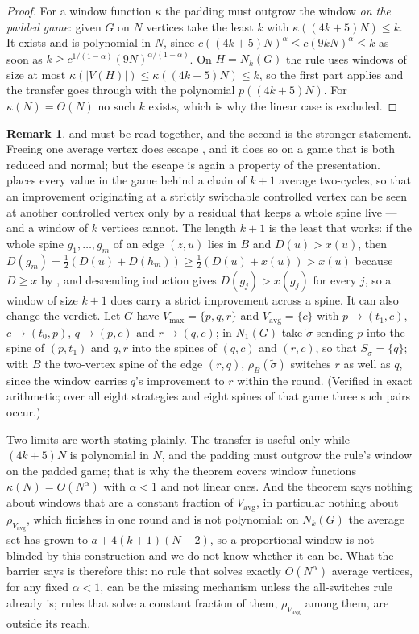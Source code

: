 \documentclass[11pt]{article}
\theoremstyle{plain}
\theoremstyle{definition}
\newtheorem{remark}[theorem]{Remark}
\newcommand{\Vmax}{V_{\max}}
\newcommand{\Vavg}{V_{\mathrm{avg}}}
\begin{document}
\begin{proof}
For a window function $\kappa$ the padding must outgrow the window
\emph{on the padded game}: given $G$ on $N$ vertices take the least $k$
with $\kappa((4k+5)N)\le k$. It exists and is polynomial in $N$, since
$c((4k+5)N)^{\alpha}\le c(9kN)^{\alpha}\le k$ as soon as
$k\ge c^{1/(1-\alpha)}(9N)^{\alpha/(1-\alpha)}$. On $H=N_k(G)$ the rule
uses windows of size at most $\kappa(|V(H)|)\le\kappa((4k+5)N)\le k$, so
the first part applies and the transfer goes through with the polynomial
$p((4k+5)N)$. For $\kappa(N)=\Theta(N)$ no such $k$ exists, which is why
the linear case is excluded.
\end{proof}

\begin{remark}\label{rem:window-barrier}
 and  must be read
together, and the second is the stronger statement. Freeing one average
vertex does escape , and it does so on a
game that is both reduced and normal; but the escape is again a property
of the presentation.  places every value in the game
behind a chain of $k+1$ average two-cycles, so that an improvement
originating at a strictly switchable controlled vertex can be seen at
another controlled vertex only by a residual that keeps a whole spine
live --- and a window of $k$ vertices cannot. The length $k+1$ is the
least that works: if the whole spine $g_1,\dots,g_m$ of an edge $(z,u)$
lies in $B$ and $D(u)>x(u)$, then $D(g_m)=\frac12(D(u)+D(h_m))
\ge\frac12(D(u)+x(u))>x(u)$ because $D\ge x$ by
, and descending induction gives $D(g_j)>x(g_j)$
for every $j$, so a window of size $k+1$ does carry a strict improvement
across a spine. It can also change the verdict. Let $G$ have $\Vmax=\{p,q,r\}$ and
$\Vavg=\{c\}$ with $p\to(t_1,c)$, $c\to(t_0,p)$, $q\to(p,c)$ and
$r\to(q,c)$; in $N_1(G)$ take $\tilde\sigma$ sending $p$ into the spine
of $(p,t_1)$ and $q,r$ into the spines of $(q,c)$ and $(r,c)$, so that
$S_{\tilde\sigma}=\{q\}$; with $B$ the two-vertex spine of the edge
$(r,q)$, $\rho_B(\tilde\sigma)$ switches $r$ as well as $q$, since the
window carries $q$'s improvement to $r$ within the round. (Verified in
exact arithmetic; over all eight strategies and eight spines of that game
three such pairs occur.)

Two limits are worth stating plainly. The transfer is useful only while
$(4k+5)N$ is polynomial in $N$, and the padding must outgrow the rule's
window on the padded game; that is why the theorem covers window
functions $\kappa(N)=O(N^{\alpha})$ with $\alpha<1$ and not linear ones.
And the theorem says nothing about windows that are a constant fraction
of $\Vavg$, in particular nothing about $\rho_{\Vavg}$, which finishes in
one round and is not polynomial: on $N_k(G)$ the average set has grown to
$a+4(k+1)(N-2)$, so a proportional window is not blinded by this
construction and we do not know whether it can be. What the barrier says is therefore this: no rule that solves exactly
$O(N^{\alpha})$ average vertices, for any fixed $\alpha<1$, can be the
missing mechanism unless the all-switches rule already is; rules that
solve a constant fraction of them, $\rho_{\Vavg}$ among them, are outside
its reach.
\end{remark}
\end{document}
